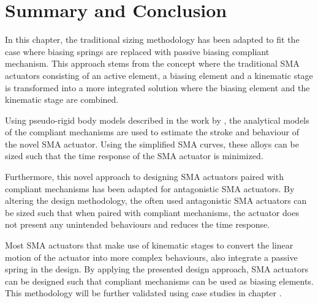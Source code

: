 \section{Summary and Conclusion}
In this chapter, the traditional sizing methodology has been adapted to fit the case where biasing springs are replaced with passive biasing compliant mechanism. This approach stems from the concept where the traditional SMA actuators consisting of an active element, a biasing element and a kinematic stage is transformed into a more integrated solution where the biasing element and the kinematic stage are combined.

Using pseudo-rigid body models described in the work by \cite{heneinConceptionStructuresArticulees2005}, the analytical models of the compliant mechanisms are used to estimate the stroke and behaviour of the novel SMA actuator. Using the simplified SMA curves, these alloys can be sized such that the time response of the SMA actuator is minimized.

Furthermore, this novel approach to designing SMA actuators paired with compliant mechanisms has been adapted for antagonistic SMA actuators. By altering the design methodology, the often used antagonistic SMA actuators can be sized such that when paired with compliant mechanisms, the actuator does not present any unintended behaviours and reduces the time response.

Most SMA actuators that make use of kinematic stages to convert the linear motion of the actuator into more complex behaviours, also integrate a passive spring in the design. By applying the presented design approach, SMA actuators can be designed such that compliant mechanisms can be used as biasing elements. This methodology will be further validated using case studies in chapter \todocite.
